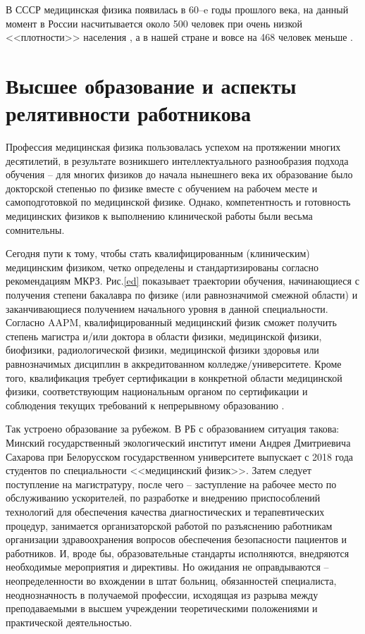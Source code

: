 \documentclass[a4paper,10pt]{extarticle}
\begin{document}
В СССР медицинская физика появилась в 60--e годы прошлого века, на данный момент в России насчитывается около 500 человек при очень низкой <<плотности>> населения \cite{Костылёв}, а в нашей стране и вовсе на 468 человек меньше \cite{Тарутин}. 





\section{Высшее образование и аспекты релятивности работникова}
Профессия медицинская физика пользовалась успехом на протяжении многих десятилетий, в результате возникшего интеллектуального разнообразия подхода обучения -- для многих физиков до начала нынешнего века их образование было докторской степенью по физике вместе с обучением на рабочем месте и самоподготовкой по медицинской физике.  Однако, компетентность и готовность медицинских физиков к выполнению клинической работы были весьма сомнительны. 

Сегодня пути к тому, чтобы стать квалифицированным (клиническим) медицинским физиком, четко определены и стандартизированы согласно рекомендациям МКРЗ. Рис.\ref{ed} показывает траектории обучения, начинающиеся с получения степени бакалавра по физике (или равнозначимой смежной области) и заканчивающиеся получением начального уровня в данной специальности.
Согласно AAPM, квалифицированный медицинский физик сможет получить степень магистра и/или доктора в области физики, медицинской физики, биофизики, радиологической физики, медицинской физики здоровья или равнозначимых дисциплин в аккредитованном колледже/университете. Кроме того, квалификация требует сертификации в конкретной области медицинской физики, соответствующим национальным органом по сертификации и соблюдения текущих требований к непрерывному образованию \cite{AAPM 2016b}. 

Так устроено образование за рубежом. В РБ с образованием ситуация такова: Минский государственный экологический институт имени Андрея Дмитриевича Сахарова при Белорусском государственном университете выпускает с 2018 года студентов по специальности <<медицинский физик>>. Затем следует поступление на магистратуру, после чего -- заступление на рабочее место по обслуживанию ускорителей, по разработке и внедрению приспособлений технологий для обеспечения качества диагностических и терапевтических процедур, занимается организаторской работой по разъяснению работникам организации здравоохранения вопросов обеспечения безопасности пациентов и работников. И, вроде бы, образовательные стандарты исполняются, внедряются необходимые мероприятия и директивы. Но ожидания не оправдываются -- неопределенности во вхождении в штат больниц, обязанностей специалиста, неоднозначность в получаемой профессии, исходящая из разрыва между преподаваемыми в высшем учреждении теоретическими положениями и практической деятельностью. 
\end{document}
